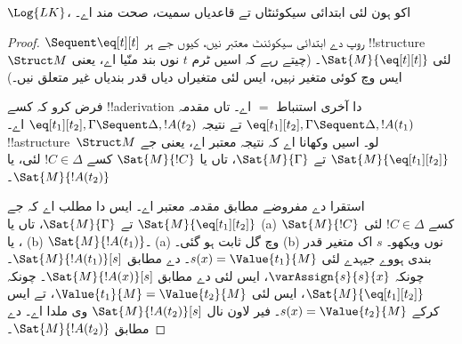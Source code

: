 \documentclass[../../../include/open-logic-section]{subfiles}
\begin{document}


\begin{prop}
$\Log{LK}$، اکو ہون لئی ابتدائی سیکوئنٹاں تے قاعدیاں سمیت، صحت مند اے۔
\end{prop}

\begin{proof}
${} \Sequent \eq[t][t]$ روپ دے ابتدائی سیکوئنٹ معتبر نیں، کیوں جے
ہر !!{structure}~$\Struct M$ لئی $\Sat{M}{\eq[t][t]}$۔ (چیتے رہے کہ
اسیں ٹرم $t$ نوں بند منّیا اے، یعنی ایس وچ کوئی متغیر نہیں، ایس لئی
متغیراں دیاں قدر بندیاں غیر متعلق نیں۔)

فرض کرو کہ کسے !!a{derivation} دا آخری استنباط $=$ اے۔ تاں مقدمہ
$\eq[t_1][t_2], \Gamma \Sequent \Delta, !A(t_1)$ تے نتیجہ
$\eq[t_1][t_2], \Gamma \Sequent \Delta, !A(t_2)$ اے۔
!!a{structure}~$\Struct M$ لو۔ اسیں وکھانا اے کہ نتیجہ معتبر اے، یعنی جے
$\Sat{M}{\eq[t_1][t_2]}$ تے $\Sat{M}{\Gamma}$، تاں یا
$\Sat{M}{!C}$ کسے $!C \in \Delta$ لئی، یا $\Sat{M}{!A(t_2)}$۔

استقرا دے مفروضے مطابق مقدمہ معتبر اے۔ ایس دا مطلب اے کہ جے
$\Sat{M}{\eq[t_1][t_2]}$ تے $\Sat{M}{\Gamma}$، تاں یا (a) کسے $!C
\in \Delta$ لئی $\Sat{M}{!C}$، یا (b) $\Sat{M}{!A(t_1)}$۔ (a) وچ
گل ثابت ہو گئی۔ (b) نوں ویکھو۔ $s$ اک متغیر قدر بندی ہووے جیہدے لئی
$s(x) = \Value{t_1}{M}$۔  دے مطابق
$\Sat{M}{!A(t_1)}[s]$۔ چونکہ $\varAssign{s}{s}{x}$، ایس لئی
 دے مطابق $\Sat{M}{!A(x)}[s]$۔ چونکہ
$\Sat{M}{\eq[t_1][t_2]}$، ایس لئی $\Value{t_1}{M} = \Value{t_2}{M}$،
تے ایس کرکے $s(x) = \Value{t_2}{M}$۔
 فیر لاون نال
$\Sat{M}{!A(t_2)}[s]$ وی ملدا اے۔
 دے مطابق
$\Sat{M}{!A(t_2)}$۔
\end{proof}
\end{document}
